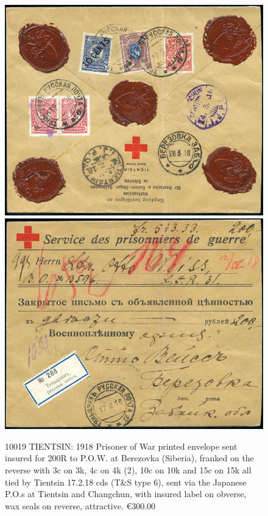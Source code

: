 \begin{figure}[htbp]
\centering
\includegraphics[width=.95\textwidth]{../russian-post-offices-in-china/10019.jpg}
\includegraphics[width=.95\textwidth]{../russian-post-offices-in-china/10019-1.jpg}
\caption{
10019 TIENTSIN: 1918 Prisoner of War printed envelope sent insured for 200R
to P.O.W. at Berezovka (Siberia), franked on the reverse with 3c on 3k, 4c on 4k (2),
10c on 10k and 15c on 15k all tied by Tientsin 17.2.18 cds (T\&S type 6), 
sent via the Japanese P.O.s at Tientsin and Changchun, with insured label on 
obverse, wax seals on reverse, attractive.
\euro 300.00
}  
\end{figure}




                                                                  